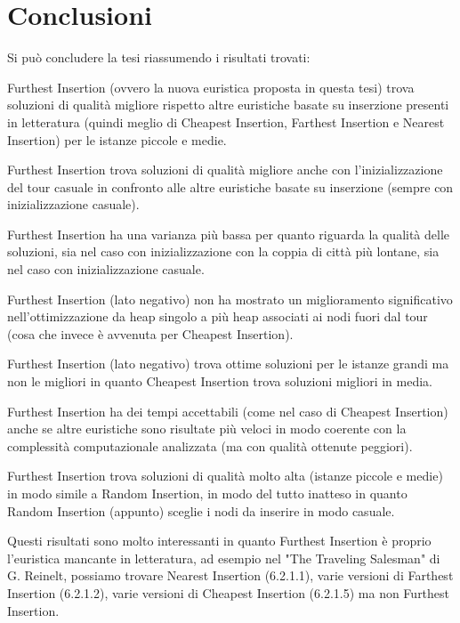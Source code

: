 \documentclass[a4paper,12pt]{report}
\begin{document}
\chapter{Conclusioni}
Si può concludere la tesi riassumendo i risultati trovati:
\begin{legal}
  \item Furthest Insertion (ovvero la nuova euristica proposta in questa tesi) trova soluzioni di qualità migliore rispetto altre euristiche basate su inserzione presenti in letteratura (quindi meglio di Cheapest Insertion, Farthest Insertion e Nearest Insertion) per le istanze piccole e medie.
  \item Furthest Insertion trova soluzioni di qualità migliore anche con l'inizializzazione del tour casuale in confronto alle altre euristiche basate su inserzione (sempre con inizializzazione casuale).
  \item Furthest Insertion ha una varianza più bassa per quanto riguarda la qualità delle soluzioni, sia nel caso con inizializzazione con la coppia di città più lontane, sia nel caso con inizializzazione casuale.
  \item Furthest Insertion (lato negativo) non ha mostrato un miglioramento significativo nell'ottimizzazione da heap singolo a più heap associati ai nodi fuori dal tour (cosa che invece è avvenuta per Cheapest Insertion).
  \item Furthest Insertion (lato negativo) trova ottime soluzioni per le istanze grandi ma non le migliori in quanto Cheapest Insertion trova soluzioni migliori in media.
  \item Furthest Insertion ha dei tempi accettabili (come nel caso di Cheapest Insertion) anche se altre euristiche sono risultate più veloci in modo coerente con la complessità computazionale analizzata (ma con qualità ottenute peggiori).
  \item Furthest Insertion trova soluzioni di qualità molto alta (istanze piccole e medie) in modo simile a Random Insertion, in modo del tutto inatteso in quanto Random Insertion (appunto) sceglie i nodi da inserire in modo casuale.
\end{legal}
Questi risultati sono molto interessanti in quanto Furthest Insertion è proprio l'euristica mancante in letteratura, ad esempio nel "The Traveling Salesman" di G. Reinelt\cite{Reinelt}, possiamo trovare Nearest Insertion (6.2.1.1), varie versioni di Farthest Insertion (6.2.1.2), varie versioni di Cheapest Insertion (6.2.1.5) ma non Furthest Insertion.
\end{document}

